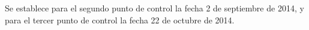 \documentclass[12pt,bibliography=oldstyle,DIV=14,parskip=full-,titlepage]{scrartcl}
\begin{document}
Se establece para el segundo punto de control la fecha 2 de septiembre 
de 2014, y para el tercer punto de control la fecha 22 de octubre de 2014.
%
%
%
\end{document}
